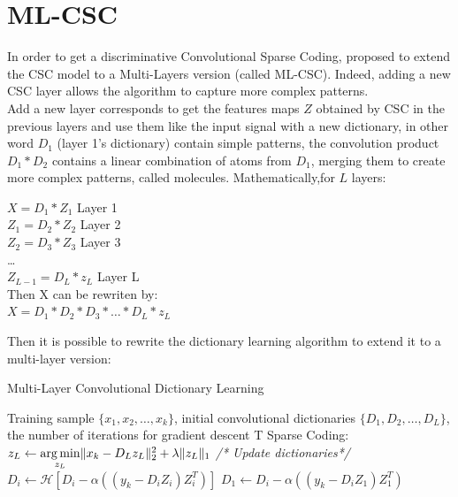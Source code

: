 \section{ML-CSC}
In order to get a discriminative Convolutional Sparse Coding, \cite{DBLP:journals/corr/abs-1708-08705,8398588} proposed to extend the CSC model to a Multi-Layers version (called ML-CSC). Indeed,  adding a new CSC layer allows the algorithm to capture more complex patterns.\\
Add a new layer corresponds to get the features maps $Z$ obtained by CSC in the previous layers and use them like the input signal with a new dictionary, in other word $D_1$  (layer 1's dictionary) contain simple patterns, the convolution product $D_1 * D_2$ contains  a linear combination of atoms from $D_1$, merging them to create more complex patterns, called molecules. Mathematically,for $L$ layers:
\begin{center}
 $X = D_1 * Z_1$ \hspace{1cm} Layer 1\\
 $Z_1 = D_2 * Z_2$\hspace{1cm} Layer 2\\
 $Z_2 = D_3 * Z_3$\hspace{1cm} Layer 3\\
 \dots\\
 $Z_{L-1} = D_L * z_L$ \hspace{1cm} Layer L\\
 Then X can be rewriten by:\\
 $X = D_1 * D_2 * D_3 *\dots *D_L * z_L$
\end{center}
Then it is possible to rewrite the dictionary learning algorithm to extend it to a multi-layer version:\\
\begin{algorithm}
 \caption{Multi-Layer Convolutional Dictionary Learning}
 \begin{algorithmic}
  \REQUIRE Training sample $\{x_1, x_2, \dots, x_k \}$, initial convolutional dictionaries $\{D_1, D_2, \dots, D_L \}$, the number of iterations for gradient descent T
        \STATE Sparse Coding: $z_L \leftarrow \underset{z_L}{\operatorname*{arg\,min}} \|x_k - D_L z_L\|^2_2  + \lambda \|z_L\|_1$
        \STATE \textit{/* Update dictionaries*/}
                 \STATE $D_i \leftarrow \mathcal{H}[D_i - \alpha ((y_k -D_i Z_i)Z_i^T) ] $
            \ENDFOR
        \ENDFOR
            \STATE $D_1 \leftarrow D_i - \alpha ((y_k -D_iZ_1) Z_1^T)$
        \ENDFOR
  \ENDFOR
 \end{algorithmic}
\end{algorithm}\\
